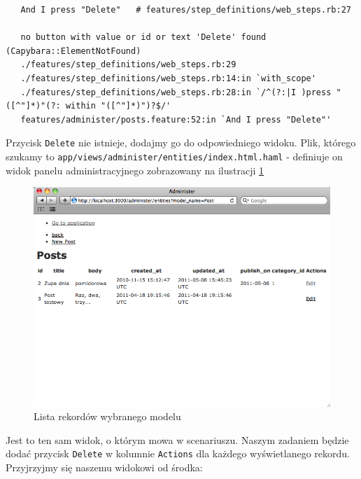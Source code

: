    \begin{lstlisting}
   And I press "Delete"   # features/step_definitions/web_steps.rb:27
   
   no button with value or id or text 'Delete' found (Capybara::ElementNotFound)
   ./features/step_definitions/web_steps.rb:29
   ./features/step_definitions/web_steps.rb:14:in `with_scope'
   ./features/step_definitions/web_steps.rb:28:in `/^(?:|I )press "([^"]*)"(?: within "([^"]*)")?$/'
   features/administer/posts.feature:52:in `And I press "Delete"'
   \end{lstlisting}
   
   Przycisk \texttt{Delete} nie istnieje, dodajmy go do odpowiedniego widoku. Plik, którego szukamy to \texttt{app/views/administer/entities/index.html.haml} - definiuje on widok panelu administracyjnego zobrazowany na ilustracji \ref{administer_index}
   
   \clearpage
   
    \begin{figure}[!h]
  		\begin{center}
  			\includegraphics[width=\linewidth]{images/administer_index.png}
  			\caption{Lista rekordów wybranego modelu}
  			\label{administer_index}
  		\end{center}
  	\end{figure}
  	
  Jest to ten sam widok, o którym mowa w scenariuszu. Naszym zadaniem będzie dodać przycisk \verb+Delete+ w kolumnie \verb+Actions+ dla każdego wyświetlanego rekordu. Przyjrzyjmy się naszemu widokowi od środka:
  
  
  
